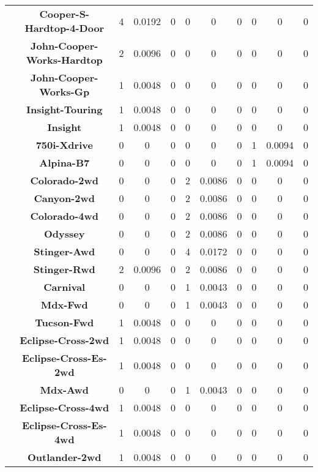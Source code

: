 \begin{center}
\begin{tabular}{|c|c||@{\hspace{1ex}}||c|c|c||@{\hspace{1ex}}||c|c|c||@{\hspace{1ex}}||c|c|c||@{\hspace{1ex}}||}
\cline{2-11}
  & {\bf Cooper-S-Hardtop-4-Door} & 4 & 0.0192 & 0 & 0 & 0 & 0 & 0 & 0 & 0 \\
\cline{2-11}
  & {\bf John-Cooper-Works-Hardtop} & 2 & 0.0096 & 0 & 0 & 0 & 0 & 0 & 0 & 0 \\
\cline{2-11}
  & {\bf John-Cooper-Works-Gp} & 1 & 0.0048 & 0 & 0 & 0 & 0 & 0 & 0 & 0 \\
\cline{2-11}
  & {\bf Insight-Touring} & 1 & 0.0048 & 0 & 0 & 0 & 0 & 0 & 0 & 0 \\
\cline{2-11}
  & {\bf Insight} & 1 & 0.0048 & 0 & 0 & 0 & 0 & 0 & 0 & 0 \\
\cline{2-11}
  & {\bf 750i-Xdrive} & 0 & 0 & 0 & 0 & 0 & 0 & 1 & 0.0094 & 0 \\
\cline{2-11}
  & {\bf Alpina-B7} & 0 & 0 & 0 & 0 & 0 & 0 & 1 & 0.0094 & 0 \\
\cline{2-11}
  & {\bf Colorado-2wd} & 0 & 0 & 0 & 2 & 0.0086 & 0 & 0 & 0 & 0 \\
\cline{2-11}
  & {\bf Canyon-2wd} & 0 & 0 & 0 & 2 & 0.0086 & 0 & 0 & 0 & 0 \\
\cline{2-11}
  & {\bf Colorado-4wd} & 0 & 0 & 0 & 2 & 0.0086 & 0 & 0 & 0 & 0 \\
\cline{2-11}
  & {\bf Odyssey} & 0 & 0 & 0 & 2 & 0.0086 & 0 & 0 & 0 & 0 \\
\cline{2-11}
  & {\bf Stinger-Awd} & 0 & 0 & 0 & 4 & 0.0172 & 0 & 0 & 0 & 0 \\
\cline{2-11}
  & {\bf Stinger-Rwd} & 2 & 0.0096 & 0 & 2 & 0.0086 & 0 & 0 & 0 & 0 \\
\cline{2-11}
  & {\bf Carnival} & 0 & 0 & 0 & 1 & 0.0043 & 0 & 0 & 0 & 0 \\
\cline{2-11}
  & {\bf Mdx-Fwd} & 0 & 0 & 0 & 1 & 0.0043 & 0 & 0 & 0 & 0 \\
\cline{2-11}
  & {\bf Tucson-Fwd} & 1 & 0.0048 & 0 & 0 & 0 & 0 & 0 & 0 & 0 \\
\cline{2-11}
  & {\bf Eclipse-Cross-2wd} & 1 & 0.0048 & 0 & 0 & 0 & 0 & 0 & 0 & 0 \\
\cline{2-11}
  & {\bf Eclipse-Cross-Es-2wd} & 1 & 0.0048 & 0 & 0 & 0 & 0 & 0 & 0 & 0 \\
\cline{2-11}
  & {\bf Mdx-Awd} & 0 & 0 & 0 & 1 & 0.0043 & 0 & 0 & 0 & 0 \\
\cline{2-11}
  & {\bf Eclipse-Cross-4wd} & 1 & 0.0048 & 0 & 0 & 0 & 0 & 0 & 0 & 0 \\
\cline{2-11}
  & {\bf Eclipse-Cross-Es-4wd} & 1 & 0.0048 & 0 & 0 & 0 & 0 & 0 & 0 & 0 \\
\cline{2-11}
  & {\bf Outlander-2wd} & 1 & 0.0048 & 0 & 0 & 0 & 0 & 0 & 0 & 0 \\

\end{tabular}
\end{center}
